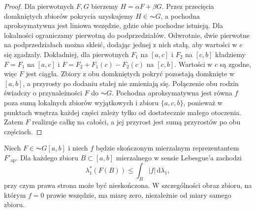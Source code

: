 \begin{proof}
Dla pierwotnych $F,G$ bierzemy $H=\alpha F+\beta G$. Przez przecięcia domkniętych zbiorów pokrycia uzyskujemy $H\in\AC G$, a pochodna aproksymatywna jest liniowa wszędzie, gdzie obie pochodne istnieją. Dla lokalności ograniczamy pierwotną do podprzedziałów. Odwrotnie, dwie pierwotne na podprzedziałach można skleić, dodając jednej z nich stałą, aby wartości w $c$ się zgadzały. Dokładniej, dla pierwotnych $F_1$ na $[a,c]$ i $F_2$ na $[c,b]$ kładziemy $F=F_1$ na $[a,c]$ i $F=F_2+F_1(c)-F_2(c)$ na $[c,b]$. Wartości w $c$ są zgodne, więc $F$ jest ciągła. Zbiory z obu domkniętych pokryć pozostają domknięte w $[a,b]$, a przyrosty po dodaniu stałej nie zmieniają się. Połączenie obu rodzin świadczy o przynależności $F$ do $\AC G$. Pochodna aproksymatywna jest równa $f$ poza sumą lokalnych zbiorów wyjątkowych i zbioru $\{a,c,b\}$, ponieważ w punktach wnętrza każdej części zależy tylko od dostatecznie małego otoczenia. Zatem $F$ realizuje całkę na całości, a jej przyrost jest sumą przyrostów po obu częściach.
\end{proof}
\begin{twierdzenie}
\label{it:thm:acg-image-bound}
Niech $F\in\AC G[a,b]$ i niech $f$ będzie skończonym
mierzalnym reprezentantem $F'_{\mathrm{ap}}$.
Dla każdego zbioru $B\subset[a,b]$ mierzalnego w sensie
Lebesgue'a zachodzi
\[
 \lambda_1^*(F(B))\le \int_B |f|\,\mathrm d\lambda_1,
\]
przy czym prawa strona może być nieskończona.
W szczególności obraz zbioru, na którym $f=0$ prawie
wszędzie, ma miarę zero, niezależnie od miary samego
zbioru.
\end{twierdzenie}
